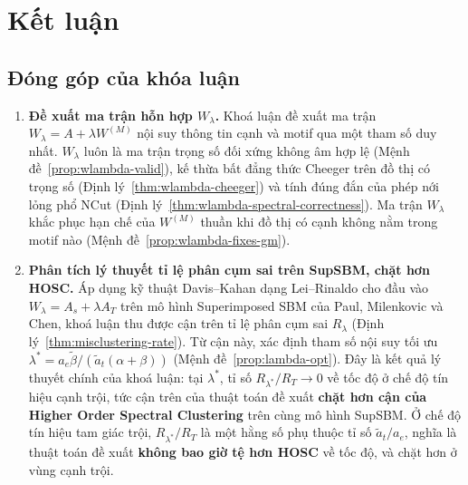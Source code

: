 
\chapter*{Kết luận}

\section*{Đóng góp của khóa luận}

\begin{enumerate}
    \item \textbf{Đề xuất ma trận hỗn hợp $W_\lambda$.} Khoá luận đề xuất ma trận $W_\lambda = A + \lambda W^{(M)}$ nội suy thông tin cạnh và motif qua một tham số duy nhất. $W_\lambda$ luôn là ma trận trọng số đối xứng không âm hợp lệ (Mệnh đề~\ref{prop:wlambda-valid}), kế thừa bất đẳng thức Cheeger trên đồ thị có trọng số (Định lý~\ref{thm:wlambda-cheeger}) và tính đúng đắn của phép nới lỏng phổ NCut (Định lý~\ref{thm:wlambda-spectral-correctness}). Ma trận $W_\lambda$ khắc phục hạn chế của $W^{(M)}$ thuần khi đồ thị có cạnh không nằm trong motif nào (Mệnh đề~\ref{prop:wlambda-fixes-gm}).

    \item \textbf{Phân tích lý thuyết tỉ lệ phân cụm sai trên SupSBM, chặt hơn HOSC.} Áp dụng kỹ thuật Davis--Kahan dạng Lei--Rinaldo cho đầu vào $W_\lambda = A_s + \lambda A_T$ trên mô hình Superimposed SBM của Paul, Milenkovic và Chen, khoá luận thu được cận trên tỉ lệ phân cụm sai $R_\lambda$ (Định lý~\ref{thm:misclustering-rate}). Từ cận này, xác định tham số nội suy tối ưu $\lambda^* = a_e \tilde\beta / (\tilde a_t (\alpha + \beta))$ (Mệnh đề~\ref{prop:lambda-opt}). Đây là kết quả lý thuyết chính của khoá luận: tại $\lambda^*$, tỉ số $R_{\lambda^*} / R_T \to 0$ về tốc độ ở chế độ tín hiệu cạnh trội, tức cận trên của thuật toán đề xuất \textbf{chặt hơn cận của Higher Order Spectral Clustering} trên cùng mô hình SupSBM. Ở chế độ tín hiệu tam giác trội, $R_{\lambda^*} / R_T$ là một hằng số phụ thuộc tỉ số $\tilde a_t / a_e$, nghĩa là thuật toán đề xuất \textbf{không bao giờ tệ hơn HOSC} về tốc độ, và chặt hơn ở vùng cạnh trội.


\end{enumerate}
